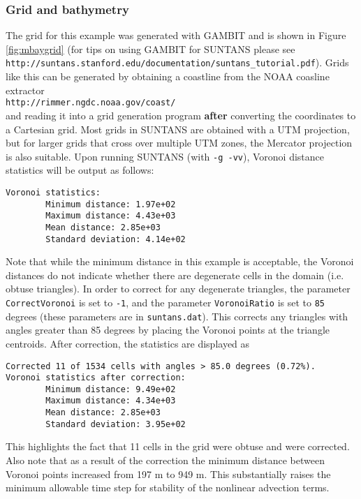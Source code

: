 \subsubsection{Grid and bathymetry}

The grid for this example was generated with GAMBIT and is shown in Figure \ref{fig:mbaygrid}
(for tips on using GAMBIT for SUNTANS please see\\
\verb+http://suntans.stanford.edu/documentation/suntans_tutorial.pdf+).
Grids like this can be generated by obtaining a coastline from the NOAA coasline extractor \\
\verb+http://rimmer.ngdc.noaa.gov/coast/+\\
and reading it into a grid generation program {\bf after} converting the coordinates to a Cartesian grid.
Most grids in SUNTANS are obtained with a UTM projection, but for larger grids that cross over multiple
UTM zones, the Mercator projection is also suitable.  
Upon running SUNTANS (with \verb+-g -vv+), Voronoi distance statistics will be output as follows:
\begin{verbatim}
Voronoi statistics:
        Minimum distance: 1.97e+02
        Maximum distance: 4.43e+03
        Mean distance: 2.85e+03
        Standard deviation: 4.14e+02
\end{verbatim}
Note that while the minimum distance in this example is acceptable, the Voronoi distances do
not indicate whether there are degenerate cells in the domain (i.e. obtuse triangles).  In order
to correct for any degenerate triangles, the parameter \verb+CorrectVoronoi+ is set to \verb+-1+,
and the parameter \verb+VoronoiRatio+ is set to \verb+85+ degrees (these parameters are in \verb+suntans.dat+).  
This corrects any triangles
with angles greater than 85 degrees by placing the Voronoi points at the triangle centroids.
After correction, the statistics are displayed as
\begin{verbatim}
Corrected 11 of 1534 cells with angles > 85.0 degrees (0.72%).
Voronoi statistics after correction:
        Minimum distance: 9.49e+02
        Maximum distance: 4.34e+03
        Mean distance: 2.85e+03
        Standard deviation: 3.95e+02
\end{verbatim}
This highlights the fact that 11 cells in the grid were obtuse and were corrected.  Also note that
as a result of the correction the minimum distance between Voronoi points increased from 197 m to
949 m.  This substantially raises the minimum allowable time step for stability of the nonlinear
advection terms.

